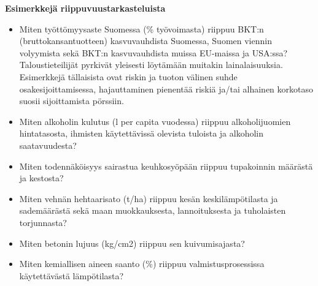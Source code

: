 \documentclass[
]{book}
\providecommand{\tightlist}{%
  \setlength{\itemsep}{0pt}\setlength{\parskip}{0pt}}
\begin{document}
\begin{eblock}{}

\textbf{Esimerkkejä riippuvuustarkasteluista}

\begin{itemize}
\tightlist
\item
  Miten työttömyysaste Suomessa (\% työvoimasta) riippuu BKT:n (bruttokansantuotteen) kasvuvauhdista Suomessa, Suomen viennin volyymista sekä BKT:n kasvuvauhdista muissa EU-maissa ja USA:ssa? Taloustieteilijät pyrkivät yleisesti löytämään muitakin lainalaisuuksia. Esimerkkejä tällaisista ovat riskin ja tuoton välinen suhde osakesijoittamisessa, hajauttaminen pienentää riskiä ja/tai alhainen korkotaso suosii sijoittamista pörssiin.\\
\item
  Miten alkoholin kulutus (l per capita vuodessa) riippuu alkoholijuomien hintatasosta, ihmisten käytettävissä olevista tuloista ja alkoholin saatavuudesta?\\
\item
  Miten todennäköisyys sairastua keuhkosyöpään riippuu tupakoinnin määrästä ja kestosta?\\
\item
  Miten vehnän hehtaarisato (t/ha) riippuu kesän keskilämpötilasta ja sademäärästä sekä maan muokkauksesta, lannoituksesta ja tuholaisten torjunnasta?\\
\item
  Miten betonin lujuus (kg/cm2) riippuu sen kuivumisajasta?\\
\item
  Miten kemiallisen aineen saanto (\%) riippuu valmistusprosessissa käytettävästä lämpötilasta?
\end{itemize}

\end{eblock}

\hfill\break
\end{document}
